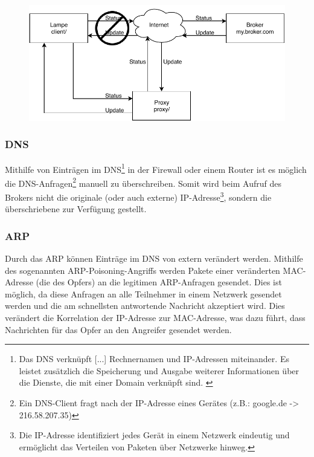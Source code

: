         \begin{figure}[h]%
            \centering
            \includegraphics[width=14cm]{tex/bilder/2_grundlagen/Szenario1_MitM.pdf}
            \label{fig:szenario-mitm}
        \end{figure}
        
        \subsubsection{DNS}
        Mithilfe von Einträgen im \ac{DNS}\footnote{\glqq Das DNS verknüpft [...] Rechnernamen und IP-Adressen miteinander. Es leistet zusätzlich die Speicherung und Ausgabe weiterer Informationen über die Dienste, die mit einer Domain verknüpft sind.\grqq{} \cite{denic_eg}} in der Firewall oder einem Router ist es möglich die \ac{DNS}-Anfragen\footnote{Ein \acs{DNS}-Client fragt nach der \acs{IP}-Adresse eines Gerätes (z.B.: google.de -> 216.58.207.35)} manuell zu überschreiben. Somit wird beim Aufruf des Brokers nicht die originale (oder auch externe) IP-Adresse\footnote{Die \acs{IP}-Adresse identifiziert jedes Gerät in einem Netzwerk eindeutig und ermöglicht das Verteilen von Paketen über Netzwerke hinweg.}, sondern die überschriebene zur Verfügung gestellt.
        \subsubsection{ARP}
        Durch das \ac{ARP} können Einträge im \ac{DNS} von extern verändert werden. Mithilfe des sogenannten \acs{ARP}-Poisoning-Angriffs werden Pakete einer veränderten \ac{MAC}-Adresse (die des Opfers) an die legitimen \ac{ARP}-Anfragen gesendet. Dies ist möglich, da diese Anfragen an alle Teilnehmer in einem Netzwerk gesendet werden und die am schnellsten antwortende Nachricht akzeptiert wird. Dies verändert die Korrelation der \acs{IP}-Adresse zur \acs{MAC}-Adresse, was dazu führt, dass Nachrichten für das Opfer an den Angreifer gesendet werden. \cite{4768661}
